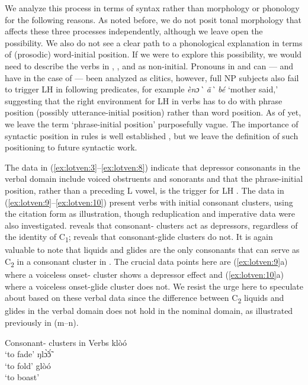 \documentclass[output=paper,newtxmath,modfonts,nonflat,hidelinks]{langsci/langscibook}
\begin{document}
We analyze this process in terms of syntax rather than morphology or phonology for the following reasons. As noted before, we do not posit tonal morphology that affects these three processes independently, although we leave open the possibility. We also do not see a clear path to a phonological explanation in terms of (prosodic) word-initial position. If we were to explore this possibility, we would need to describe the verbs in , , and  as non-initial. Pronouns in  and  can — and have in the case of  \citep{Duthie1996} — been analyzed as clitics, however, full NP subjects also fail to trigger LH  in following predicates, for example \textit{ènɔ\`{} ã\`{}  bé} ‘mother said,’ suggesting that the right environment for LH  in verbs has to do with phrase position (possibly utterance-initial position) rather than word position. As of yet, we leave the term ‘phrase-initial position’ purposefully vague. The importance of syntactic position in  rules is well established \citep{Snider2014}, but we leave the definition of such positioning to future syntactic work.

The data in (\ref{ex:lotven:3}–\ref{ex:lotven:8}) indicate that depressor consonants in the verbal domain include voiced obstruents and sonorants and that the phrase-initial position, rather than a preceding L  vowel, is the trigger for LH . The data in (\ref{ex:lotven:9}--\ref{ex:lotven:10}) present verbs with initial consonant clusters, using the citation form as illustration, though reduplication and imperative data were also investigated.  reveals that consonant- clusters act as depressors, regardless of the identity of C\textsubscript{1};  reveals that consonant-glide clusters do not. It is again valuable to note that liquids and glides are the only consonants that can serve as C\textsubscript{2} in a consonant cluster in . The crucial data points here are (\ref{ex:lotven:9}a) where a voiceless onset- cluster shows a depressor effect and (\ref{ex:lotven:10}a) where a voiceless onset-glide cluster does not. We resist the urge here to speculate about  based on these verbal data since the difference between C\textsubscript{2} liquids and glides in the verbal domain does not hold in the nominal domain, as illustrated previously in  (m–n).

\ea\label{ex:lotven:9}Consonant- clusters in  Verbs
\ea\label{ex:lotven:9a}
    klòó\\
    \glt ‘to fade’
\ex\label{ex:lotven:9b}
	ŋlɔ̃̀ɔ̃́\\
    \glt ‘to fold’
\ex\label{ex:lotven:9c}
	glòó\\
    \glt ‘to boast’
\z
\z
\end{document}
